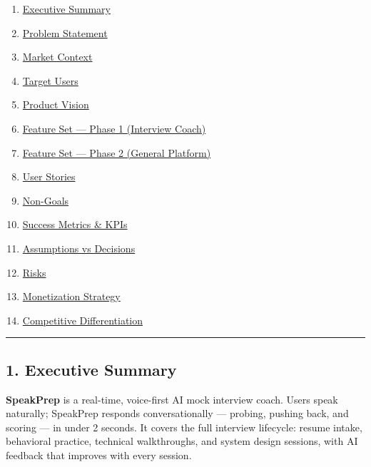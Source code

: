 \documentclass[
  11pt,
]{article}
\providecommand{\tightlist}{%
  \setlength{\itemsep}{0pt}\setlength{\parskip}{0pt}}
\begin{document}
\begin{enumerate}
\def\labelenumi{\arabic{enumi}.}
\tightlist
\item
  \protect\hyperlink{1-executive-summary}{Executive Summary}
\item
  \protect\hyperlink{2-problem-statement}{Problem Statement}
\item
  \protect\hyperlink{3-market-context}{Market Context}
\item
  \protect\hyperlink{4-target-users}{Target Users}
\item
  \protect\hyperlink{5-product-vision}{Product Vision}
\item
  \protect\hyperlink{6-feature-set--phase-1}{Feature Set --- Phase 1
  (Interview Coach)}
\item
  \protect\hyperlink{7-feature-set--phase-2-deferred}{Feature Set ---
  Phase 2 (General Platform)}
\item
  \protect\hyperlink{8-user-stories}{User Stories}
\item
  \protect\hyperlink{9-non-goals}{Non-Goals}
\item
  \protect\hyperlink{10-success-metrics--kpis}{Success Metrics \& KPIs}
\item
  \protect\hyperlink{11-assumptions-vs-decisions}{Assumptions vs
  Decisions}
\item
  \protect\hyperlink{12-risks}{Risks}
\item
  \protect\hyperlink{13-monetization-strategy}{Monetization Strategy}
\item
  \protect\hyperlink{14-competitive-differentiation}{Competitive
  Differentiation}
\end{enumerate}

\begin{center}\rule{0.5\linewidth}{0.5pt}\end{center}

\hypertarget{executive-summary}{%
\subsection{1. Executive Summary}\label{executive-summary}}

\textbf{SpeakPrep} is a real-time, voice-first AI mock interview coach.
Users speak naturally; SpeakPrep responds conversationally --- probing,
pushing back, and scoring --- in under 2 seconds. It covers the full
interview lifecycle: resume intake, behavioral practice, technical
walkthroughs, and system design sessions, with AI feedback that improves
with every session.
\end{document}
